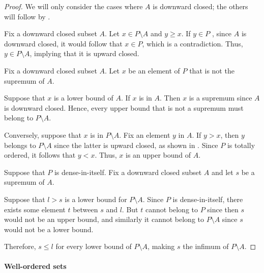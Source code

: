 \begin{proof}
  We will only consider the cases where \( A \) is downward closed; the others will follow by .

   Fix a downward closed subset \( A \). Let \( x \in P \setminus A \) and \( y \geq x \). If \( y \in P \) , since \( A \) is downward closed, it would follow that \( x \in P \), which is a contradiction. Thus, \( y \in P \setminus A \), implying that it is upward closed.

   Fix a downward closed subset \( A \). Let \( x \) be an element of \( P \) that is not the supremum of \( A \).

  \SufficiencySubProof* Suppose that \( x \) is a lower bound of \( A \). If \( x \) is in \( A \). Then \( x \) is a supremum since \( A \) is downward closed. Hence, every upper bound that is not a supremum must belong to \( P \setminus A \).

  \NecessitySubProof* Conversely, suppose that \( x \) is in \( P \setminus A \). Fix an element \( y \) in \( A \). If \( y > x \), then \( y \) belongs to \( P \setminus A \) since the latter is upward closed, as shown in . Since \( P \) is totally ordered, it follows that \( y < x \). Thus, \( x \) is an upper bound of \( A \).

   Suppose that \( P \) is dense-in-itself. Fix a downward closed subset \( A \) and let \( s \) be a supremum of \( A \).

  Suppose that \( l > s \) is a lower bound for \( P \setminus A \). Since \( P \) is dense-in-itself, there exists some element \( t \) between \( s \) and \( l \). But \( t \) cannot belong to \( P \) since then \( s \) would not be an upper bound, and similarly it cannot belong to \( P \setminus A \) since \( s \) would not be a lower bound.

  Therefore, \( s \leq l \) for every lower bound of \( P \setminus A \), making \( s \) the infimum of \( P \setminus A \).
\end{proof}

\paragraph{Well-ordered sets}

